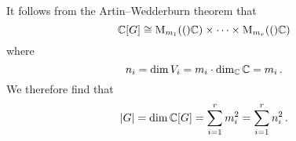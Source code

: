 \section{}

It follows from the Artin--Wedderburn theorem that
\[
  \mathbb{C}[G]
  \cong
  \operatorname{M}_{m_1}(()\mathbb{C})
  \times
  \dotsb
  \times
  \operatorname{M}_{m_r}(()\mathbb{C})
\]
where
\[
  n_i
  =
  \dim V_i
  =
  m_i \cdot \dim_{\mathbb{C}} \mathbb{C}
  =
  m_i \,.
\]
We therefore find that
\[
  \lvert G\rvert
  =
  \dim \mathbb{C}[G]
  =
  \sum_{i=1}^r m_i^2
  =
  \sum_{i=1}^r n_i^2  \,.
\]




